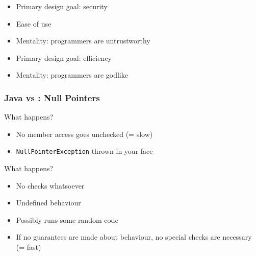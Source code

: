 \begin{frame}
\begin{overprint}
    \begin{itemize}
      \item Primary design goal: security
      \item Ease of use
      \item Mentality: programmers are untrustworthy
    \end{itemize}

    \begin{itemize}
      \item Primary design goal: efficiency
      \item Mentality: programmers are godlike
    \end{itemize}
  \end{overprint}
\end{frame}

\begin{frame}
  \frametitle{Java vs \cpp: Null Pointers}
  \begin{overprint}
    \begin{center}
      What happens?
    \end{center}

    \begin{itemize}
      \item No member access goes unchecked (= slow)
      \item \texttt{NullPointerException} thrown in your face
    \end{itemize}
  \end{overprint}
  \vskip2mm
  \structure{\cpp}
  \begin{overprint}
    \begin{center}
      What happens?
    \end{center}

    \begin{itemize}
      \item No checks whatsoever
      \item Undefined behaviour
      \item Possibly runs some random code
      \item If no guarantees are made about behaviour, no special checks are necessary (= fast)
    \end{itemize}
  \end{overprint}
\end{frame}

